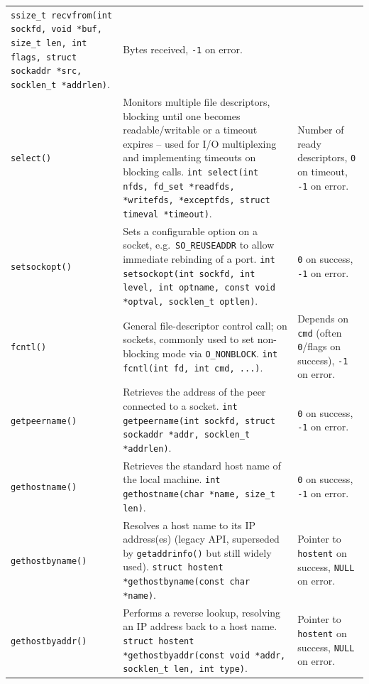 \documentclass[11pt]{article}
\begin{document}
\begin{longtable}{p{2.6cm}p{6.3cm}p{5.3cm}}
\texttt{ssize\_t recvfrom(int sockfd, void *buf, size\_t len, int flags, struct sockaddr *src, socklen\_t *addrlen)}. &
Bytes received, \texttt{-1} on error. \\
\texttt{select()} & Monitors multiple file descriptors, blocking until one becomes readable/writable or a timeout expires -- used for I/O multiplexing and implementing timeouts on blocking calls. \newline
\texttt{int select(int nfds, fd\_set *readfds, *writefds, *exceptfds, struct timeval *timeout)}. &
Number of ready descriptors, \texttt{0} on timeout, \texttt{-1} on error. \\
\texttt{setsockopt()} & Sets a configurable option on a socket, e.g.\ \texttt{SO\_REUSEADDR} to allow immediate rebinding of a port. \newline
\texttt{int setsockopt(int sockfd, int level, int optname, const void *optval, socklen\_t optlen)}. &
\texttt{0} on success, \texttt{-1} on error. \\
\texttt{fcntl()} & General file-descriptor control call; on sockets, commonly used to set non-blocking mode via \texttt{O\_NONBLOCK}. \newline
\texttt{int fcntl(int fd, int cmd, ...)}. &
Depends on \texttt{cmd} (often \texttt{0}/flags on success), \texttt{-1} on error. \\
\texttt{getpeername()} & Retrieves the address of the peer connected to a socket. \newline
\texttt{int getpeername(int sockfd, struct sockaddr *addr, socklen\_t *addrlen)}. &
\texttt{0} on success, \texttt{-1} on error. \\
\texttt{gethostname()} & Retrieves the standard host name of the local machine. \newline
\texttt{int gethostname(char *name, size\_t len)}. &
\texttt{0} on success, \texttt{-1} on error. \\
\texttt{gethostbyname()} & Resolves a host name to its IP address(es) (legacy API, superseded by \texttt{getaddrinfo()} but still widely used). \newline
\texttt{struct hostent *gethostbyname(const char *name)}. &
Pointer to \texttt{hostent} on success, \texttt{NULL} on error. \\
\texttt{gethostbyaddr()} & Performs a reverse lookup, resolving an IP address back to a host name. \newline
\texttt{struct hostent *gethostbyaddr(const void *addr, socklen\_t len, int type)}. &
Pointer to \texttt{hostent} on success, \texttt{NULL} on error. \\
\bottomrule
\end{longtable}
\end{document}
